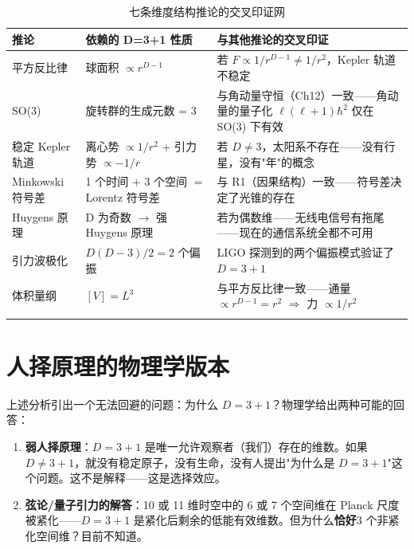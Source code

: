\begin{center}
\small
\begin{longtable}{p{3cm}p{3.5cm}p{7.5cm}}
\toprule
\textbf{推论} & \textbf{依赖的 D=3+1 性质} & \textbf{与其他推论的交叉印证} \\
\midrule
平方反比律 & 球面积 $\propto r^{D-1}$ & 若 $F\propto 1/r^{D-1}\neq 1/r^2$，Kepler 轨道不稳定 \\
SO(3) & 旋转群的生成元数 = 3 & 与角动量守恒（Ch12）一致——角动量的量子化 $\ell(\ell+1)\hbar^2$ 仅在 SO(3) 下有效 \\
稳定 Kepler 轨道 & 离心势 $\propto 1/r^2$ + 引力势 $\propto -1/r$ & 若 $D\neq3$，太阳系不存在——没有行星，没有"年"的概念 \\
Minkowski 符号差 & 1 个时间 $+$ 3 个空间 $=$ Lorentz 符号差 & 与 R1（因果结构）一致——符号差决定了光锥的存在 \\
Huygens 原理 & D 为奇数 $\to$ 强 Huygens 原理 & 若为偶数维——无线电信号有拖尾——现在的通信系统全都不可用 \\
引力波极化 & $D(D-3)/2 = 2$ 个偏振 & LIGO 探测到的两个偏振模式验证了 $D=3+1$ \\
体积量纲 & $[V] = L^3$ & 与平方反比律一致——通量 $\propto r^{D-1} = r^2$  $\Rightarrow$ 力 $\propto 1/r^2$\\
\bottomrule
\caption{七条维度结构推论的交叉印证网}
\end{longtable}
\end{center}


\section{人择原理的物理学版本}

上述分析引出一个无法回避的问题：为什么 $D=3+1$？物理学给出两种可能的回答：

\begin{enumerate}
  \item \textbf{弱人择原理}：$D=3+1$ 是唯一允许观察者（我们）存在的维数。如果 $D\neq3+1$，就没有稳定原子，没有生命，没有人提出"为什么是 $D=3+1$"这个问题。这不是解释——这是选择效应。
  \item \textbf{弦论/量子引力的解答}：10 或 11 维时空中的 6 或 7 个空间维在 Planck 尺度被紧化——$D=3+1$ 是紧化后剩余的低能有效维数。但为什么\textbf{恰好}3 个非紧化空间维？目前不知道。
\end{enumerate}

